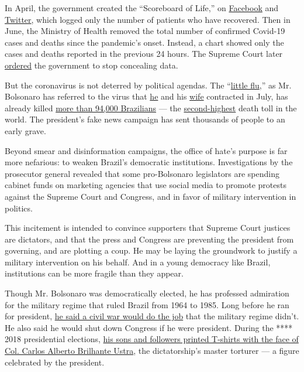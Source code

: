 In April, the government created the ``Scoreboard of Life,'' on
\href{https://www.facebook.com/minsaude/posts/3549590468392877}{Facebook}
and
\href{https://twitter.com/secomvc/status/1257836970518200323}{Twitter},
which logged only the number of patients who have recovered. Then in
June, the Ministry of Health removed the total number of confirmed
Covid-19 cases and deaths since the pandemic's onset. Instead, a chart
showed only the cases and deaths reported in the previous 24 hours. The
Supreme Court later
\href{https://www.nytimes.com/2020/06/19/world/coronavirus-live-updates.html}{ordered}
the government to stop concealing data.

But the coronavirus is not deterred by political agendas. The
``\href{https://www.cnn.com/2020/05/23/americas/brazil-coronavirus-hospitals-intl/index.html}{little
flu},'' as Mr. Bolsonaro has referred to the virus that
\href{https://www.reuters.com/article/us-health-coronavirus-brazil-bolsonaro/brazilian-president-bolsonaro-says-he-has-mold-in-lungs-idUSKCN24V3SH}{he}
and his
\href{https://time.com/5874061/bolsonaro-wife-coronavirus/}{wife}
contracted in July, has already killed
\href{https://www.nytimes.com/interactive/2020/world/americas/brazil-coronavirus-cases.html}{more
than 94,000 Brazilians} --- the
\href{https://coronavirus.jhu.edu/map.html}{second-highest} death toll
in the world. The president's fake news campaign has sent thousands of
people to an early grave.

Beyond smear and disinformation campaigns, the office of hate's purpose
is far more nefarious: to weaken Brazil's democratic institutions.
Investigations by the prosecutor general revealed that some
pro-Bolsonaro legislators are spending cabinet funds on marketing
agencies that use social media to promote protests against the Supreme
Court and Congress, and in favor of military intervention in politics.

This incitement is intended to convince supporters that Supreme Court
justices are dictators, and that the press and Congress are preventing
the president from governing, and are plotting a coup. He may be laying
the groundwork to justify a military intervention on his behalf. And in
a young democracy like Brazil, institutions can be more fragile than
they appear.

Though Mr. Bolsonaro was democratically elected, he has professed
admiration for the military regime that ruled Brazil from 1964 to 1985.
Long before he ran for president,
\href{https://www.youtube.com/watch?v=qIDyw9QKIvw\&t=577s}{he said a
civil war would do the job} that the military regime didn't. He also
said he would shut down Congress if he were president. During the ****
2018 presidential elections,
\href{https://congressoemfoco.uol.com.br/especial/noticias/fas-usam-imagem-de-torturador-para-promover-bolsonaro/}{his
sons and followers printed T-shirts with the face of Col. Carlos Alberto
Brilhante Ustra}, the dictatorship's master torturer --- a figure
celebrated by the president.

